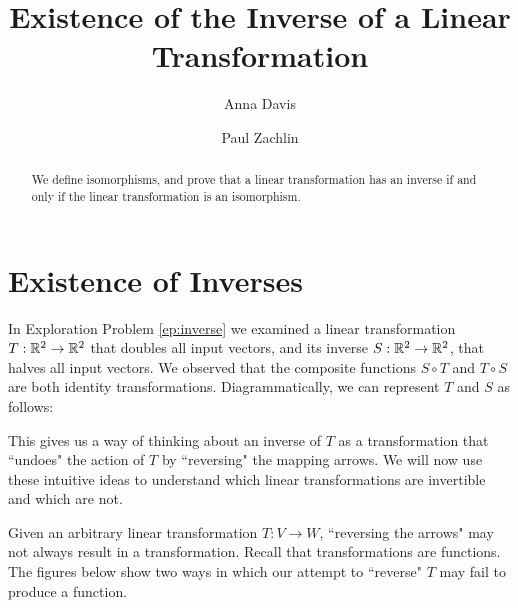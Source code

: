 \documentclass{ximera}
\author{Anna Davis \and Paul Zachlin} \title{Existence of the Inverse of a Linear Transformation} \license{CC-BY 4.0}
\begin{document}
\begin{abstract}
  We define  isomorphisms, and prove that a linear transformation has an inverse if and only if the linear transformation is an isomorphism.
\end{abstract}
\maketitle



\section*{Existence of Inverses}

In Exploration Problem \ref{ep:inverse} we examined a linear transformation $T:\mathbb{R}^2\rightarrow \mathbb{R}^2$ that doubles all input vectors, and its inverse $S:\mathbb{R}^2\rightarrow \mathbb{R}^2$, that halves all input vectors.  We observed that the composite functions $S\circ T$ and $T\circ S$ are both identity transformations.  Diagrammatically, we can represent $T$ and $S$ as follows:
 \begin{center}
\end{center}

This gives us a way of thinking about an inverse of $T$ as a transformation that ``undoes" the action of $T$ by ``reversing" the mapping arrows.  We will now use these intuitive ideas to understand which linear transformations are invertible and which are not.

Given an arbitrary linear transformation $T:V\rightarrow W$, ``reversing the arrows"
 may not always result in a transformation. Recall that transformations are functions.  The figures below show two ways in which our attempt to ``reverse" $T$ may fail to produce a function.
 
\end{document}
